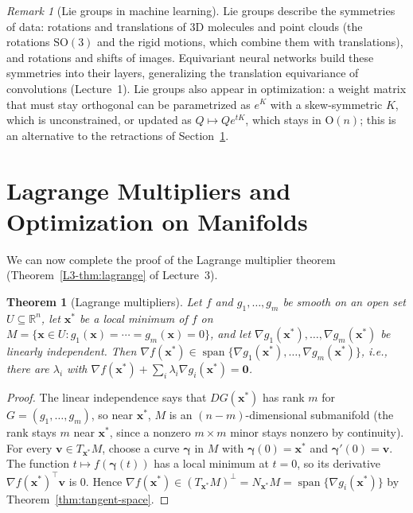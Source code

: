 \documentclass[11pt]{article}
\theoremstyle{definition}
\theoremstyle{plain}
\newtheorem{theorem}[definition]{Theorem}
\theoremstyle{remark}
\newtheorem{remark}[definition]{Remark}
\DeclareMathOperator{\Span}{span}
\begin{document}
\begin{remark}[Lie groups in machine learning]
    Lie groups describe the symmetries of data: rotations and translations of 3D molecules and point clouds (the rotations $\mathrm{SO}(3)$ and the rigid motions, which combine them with translations), and rotations and shifts of images. Equivariant neural networks build these symmetries into their layers, generalizing the translation equivariance of convolutions (Lecture~1). Lie groups also appear in optimization: a weight matrix that must stay orthogonal can be parametrized as $e^K$ with a skew-symmetric $K$, which is unconstrained, or updated as $Q \mapsto Qe^{tK}$, which stays in $\mathrm{O}(n)$; this is an alternative to the retractions of Section~\ref{sec:lagrange}.
\end{remark}

\section{Lagrange Multipliers and Optimization on Manifolds}\label{sec:lagrange}

We can now complete the proof of the Lagrange multiplier theorem (Theorem~\ref{L3-thm:lagrange} of Lecture~3).

\begin{theorem}[Lagrange multipliers]\label{thm:lagrange-proof}
    Let $f$ and $g_1, \ldots, g_m$ be smooth on an open set $U \subseteq \mathbb{R}^n$, let $\mathbf{x}^*$ be a local minimum of $f$ on $M = \{\mathbf{x} \in U : g_1(\mathbf{x}) = \cdots = g_m(\mathbf{x}) = 0\}$, and let $\nabla g_1(\mathbf{x}^*), \ldots, \nabla g_m(\mathbf{x}^*)$ be linearly independent. Then $\nabla f(\mathbf{x}^*) \in \Span\{\nabla g_1(\mathbf{x}^*), \ldots, \nabla g_m(\mathbf{x}^*)\}$, i.e., there are $\lambda_i$ with $\nabla f(\mathbf{x}^*) + \sum_i \lambda_i\nabla g_i(\mathbf{x}^*) = \mathbf{0}$.
\end{theorem}

\begin{proof}
    The linear independence says that $DG(\mathbf{x}^*)$ has rank $m$ for $G = (g_1, \ldots, g_m)$, so near $\mathbf{x}^*$, $M$ is an $(n - m)$-dimensional submanifold (the rank stays $m$ near $\mathbf{x}^*$, since a nonzero $m \times m$ minor stays nonzero by continuity). For every $\mathbf{v} \in T_{\mathbf{x}^*}M$, choose a curve $\boldsymbol{\gamma}$ in $M$ with $\boldsymbol{\gamma}(0) = \mathbf{x}^*$ and $\boldsymbol{\gamma}'(0) = \mathbf{v}$. The function $t \mapsto f(\boldsymbol{\gamma}(t))$ has a local minimum at $t = 0$, so its derivative $\nabla f(\mathbf{x}^*)^\top\mathbf{v}$ is $0$. Hence $\nabla f(\mathbf{x}^*) \in (T_{\mathbf{x}^*}M)^\perp = N_{\mathbf{x}^*}M = \Span\{\nabla g_i(\mathbf{x}^*)\}$ by Theorem~\ref{thm:tangent-space}.
\end{proof}
\end{document}
